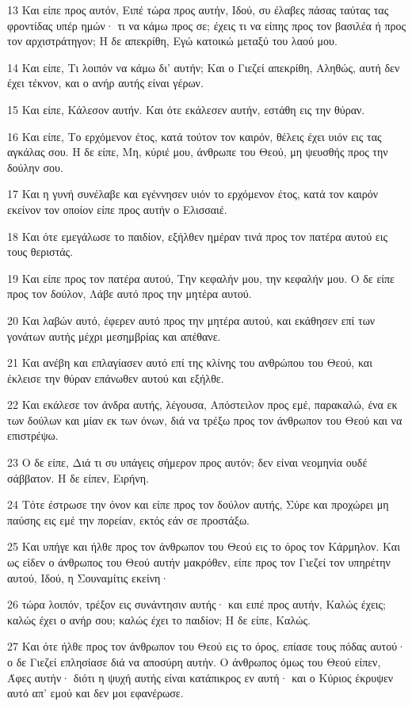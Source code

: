 \par 13 Και είπε προς αυτόν, Ειπέ τώρα προς αυτήν, Ιδού, συ έλαβες πάσας ταύτας τας φροντίδας υπέρ ημών· τι να κάμω προς σε; έχεις τι να είπης προς τον βασιλέα ή προς τον αρχιστράτηγον; Η δε απεκρίθη, Εγώ κατοικώ μεταξύ του λαού μου.
\par 14 Και είπε, Τι λοιπόν να κάμω δι' αυτήν; Και ο Γιεζεί απεκρίθη, Αληθώς, αυτή δεν έχει τέκνον, και ο ανήρ αυτής είναι γέρων.
\par 15 Και είπε, Κάλεσον αυτήν. Και ότε εκάλεσεν αυτήν, εστάθη εις την θύραν.
\par 16 Και είπε, Το ερχόμενον έτος, κατά τούτον τον καιρόν, θέλεις έχει υιόν εις τας αγκάλας σου. Η δε είπε, Μη, κύριέ μου, άνθρωπε του Θεού, μη ψευσθής προς την δούλην σου.
\par 17 Και η γυνή συνέλαβε και εγέννησεν υιόν το ερχόμενον έτος, κατά τον καιρόν εκείνον τον οποίον είπε προς αυτήν ο Ελισσαιέ.
\par 18 Και ότε εμεγάλωσε το παιδίον, εξήλθεν ημέραν τινά προς τον πατέρα αυτού εις τους θεριστάς.
\par 19 Και είπε προς τον πατέρα αυτού, Την κεφαλήν μου, την κεφαλήν μου. Ο δε είπε προς τον δούλον, Λάβε αυτό προς την μητέρα αυτού.
\par 20 Και λαβών αυτό, έφερεν αυτό προς την μητέρα αυτού, και εκάθησεν επί των γονάτων αυτής μέχρι μεσημβρίας και απέθανε.
\par 21 Και ανέβη και επλαγίασεν αυτό επί της κλίνης του ανθρώπου του Θεού, και έκλεισε την θύραν επάνωθεν αυτού και εξήλθε.
\par 22 Και εκάλεσε τον άνδρα αυτής, λέγουσα, Απόστειλον προς εμέ, παρακαλώ, ένα εκ των δούλων και μίαν εκ των όνων, διά να τρέξω προς τον άνθρωπον του Θεού και να επιστρέψω.
\par 23 Ο δε είπε, Διά τι συ υπάγεις σήμερον προς αυτόν; δεν είναι νεομηνία ουδέ σάββατον. Η δε είπεν, Ειρήνη.
\par 24 Τότε έστρωσε την όνον και είπε προς τον δούλον αυτής, Σύρε και προχώρει μη παύσης εις εμέ την πορείαν, εκτός εάν σε προστάξω.
\par 25 Και υπήγε και ήλθε προς τον άνθρωπον του Θεού εις το όρος τον Κάρμηλον. Και ως είδεν ο άνθρωπος του Θεού αυτήν μακρόθεν, είπε προς τον Γιεζεί τον υπηρέτην αυτού, Ιδού, η Σουναμίτις εκείνη·
\par 26 τώρα λοιπόν, τρέξον εις συνάντησιν αυτής· και ειπέ προς αυτήν, Καλώς έχεις; καλώς έχει ο ανήρ σου; καλώς έχει το παιδίον; Η δε είπε, Καλώς.
\par 27 Και ότε ήλθε προς τον άνθρωπον του Θεού εις το όρος, επίασε τους πόδας αυτού· ο δε Γιεζεί επλησίασε διά να αποσύρη αυτήν. Ο άνθρωπος όμως του Θεού είπεν, Άφες αυτήν· διότι η ψυχή αυτής είναι κατάπικρος εν αυτή· και ο Κύριος έκρυψεν αυτό απ' εμού και δεν μοι εφανέρωσε.
